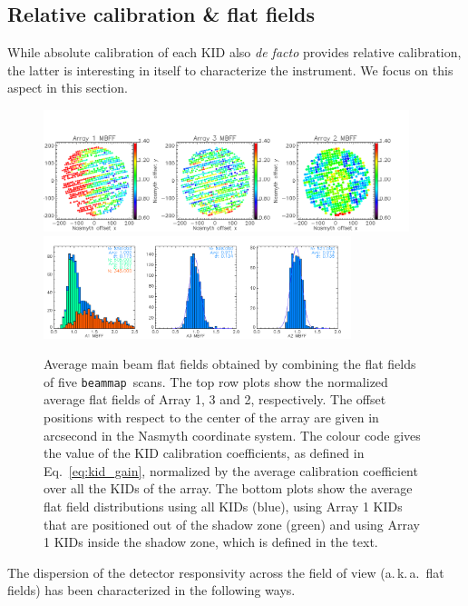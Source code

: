 \documentclass[traditionalabstract]{aa}
\newcommand{\aka}{a.\,k.\,a.}
\newcommand{\bm}{{\tt beammap}}
\newcommand{\lp}[1]{#1}
\begin{document}
\subsection{Relative calibration \& flat fields}
\label{se:flat_field}
While absolute calibration of each KID also \emph{de facto} provides
relative calibration, the latter is interesting in itself to
characterize the instrument. We focus on this aspect in this
section.

\begin{figure}[!thbp] 
\begin{center}
  \includegraphics[width=0.95\textwidth]{Figures/Average_main_beam_flat_field_N2R9_10.png}
  \includegraphics[width=0.8\textwidth]{Figures/Histo_average_main_beam_flat_field_N2R9_10.png}
\caption[Average main beam flat fields]{Average main beam flat fields
  obtained by combining the flat fields of five
  \bm\ scans. The top row plots show the normalized average flat fields of Array
  1, 3 and 2, respectively. {\lp The offset positions with respect to the center of
  the array are given in arcsecond in the Nasmyth coordinate
  system. The colour code gives the value of the KID calibration
  coefficients, as defined in Eq.~\ref{eq:kid_gain}, normalized by the
  average calibration coefficient over all the
  KIDs of the array.} The bottom plots
  show the average flat field distributions using all KIDs (blue),
  using Array 1 KIDs that are positioned out of the shadow zone
  (green) and using Array 1 KIDs inside the shadow zone, which is
  defined in the text.}
 \label{fig:avg_mbff}
\end{center}
\end{figure}

The dispersion of the detector responsivity across the field of view (\aka\ flat
fields) has been characterized in the following ways.
\end{document}
